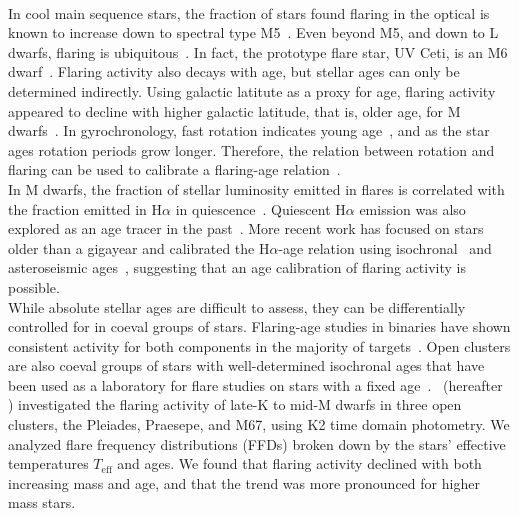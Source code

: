 \documentclass{aa}
\begin{document}
\\
In cool main sequence stars, the fraction of stars found flaring in the optical is known to increase down to spectral type M5~\citep{yang_flaring_2017, chang2020}. Even beyond M5, and down to L dwarfs, flaring is ubiquitous~\citep{stelzer2006, robrade2010, gizis2013, schmidt2015, schmidt2016, paudel2018, paudel2020}. In fact, the prototype flare star, UV Ceti, is an M6 dwarf~\citep{kirkpatrick1991}.  
Flaring activity also decays with age, but stellar ages can only be determined indirectly. Using galactic latitute as a proxy for age, flaring activity appeared to decline with higher galactic latitude, that is, older age, for M dwarfs~\citep{hilton2010, walkowicz2011, howard2019}. In gyrochronology, fast rotation indicates young age~\citep{barnes_rotational_2003}, and as the star ages rotation periods grow longer. Therefore, the relation between rotation and flaring can be used to calibrate a flaring-age relation~\citep{davenport2019}. 
\\
In M dwarfs, the fraction of stellar luminosity emitted in flares is correlated with the fraction emitted in H$\alpha$ in quiescence~\citep{yang_flaring_2017}. Quiescent H$\alpha$ emission was also explored as an age tracer in the past~\citep{soderblom_chromospheric_1991, pace_chromospheric_2013, lorenzo-oliveira_age-mass-metallicity-activity_2016}. More recent work has focused on stars older than a gigayear and calibrated the H$\alpha$-age relation using isochronal~\citep{lorenzooliveira2018} and asteroseismic ages~\citep{booth2017, booth2020}, suggesting that an age calibration of flaring activity is possible.
\\
While absolute stellar ages are difficult to assess, they can be differentially controlled for in coeval groups of stars. Flaring-age studies in binaries have shown consistent activity for both components in the majority of targets~\citep{lurie2015, clarke_flare_2018}. Open clusters are also coeval groups of stars with well-determined isochronal ages that have been used as a laboratory for flare studies on stars with a fixed age~\citep{mirzoyan1993, chang2015}. \citet{ilin2019}~(hereafter ) investigated the flaring activity of late-K to mid-M dwarfs in three open clusters, the Pleiades, Praesepe, and M67, using K2 time domain photometry. We analyzed flare frequency distributions (FFDs) broken down by the stars' effective temperatures $T_\mathrm{eff}$ and ages. We found that flaring activity declined with both increasing mass and age, and that the trend was more pronounced for higher mass stars. 
\end{document}
